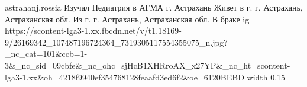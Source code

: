  
 
 
 
 

\par
astrahanj,rossia
Изучал Педиатрия в АГМА г. Астрахань
Живет в г. г. Астрахань, Астраханская обл.
Из г. г. Астрахань, Астраханская обл.
В браке
\ifcmt
  ig https://scontent-lga3-1.xx.fbcdn.net/v/t1.18169-9/26169342_107487196724364_7319305117554355075_n.jpg?_nc_cat=101&ccb=1-3&_nc_sid=09cbfe&_nc_ohc=sjHcB1XHRroAX_x27YP&_nc_ht=scontent-lga3-1.xx&oh=4218f9940ef354768128feaafd3ed6f2&oe=6120BEBD
  width 0.15
\fi
